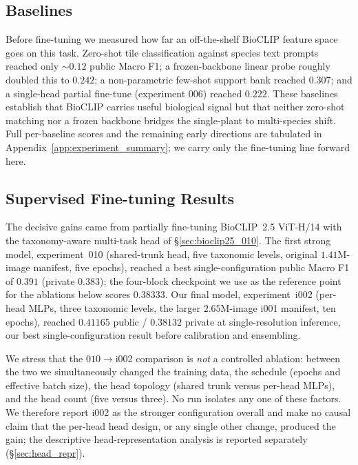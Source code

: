 \subsection{Baselines}
\label{sec:baselines}

Before fine-tuning we measured how far an off-the-shelf BioCLIP feature space goes on this
task. Zero-shot tile classification against species text prompts reached only ${\sim}0.12$
public Macro F1; a frozen-backbone linear probe roughly doubled this to $0.242$; a
non-parametric few-shot support bank reached $0.307$; and a single-head partial fine-tune
(experiment 006) reached $0.222$. These baselines establish that BioCLIP carries useful
biological signal but that neither zero-shot matching nor a frozen backbone bridges the
single-plant to multi-species shift. Full per-baseline scores and the remaining early
directions are tabulated in Appendix~\ref{app:experiment_summary}; we carry only the
fine-tuning line forward here.

\subsection{Supervised Fine-tuning Results}
\label{sec:supervised_ft}

The decisive gains came from partially fine-tuning BioCLIP~2.5 ViT-H/14 with the
taxonomy-aware multi-task head of \S\ref{sec:bioclip25_010}. The first strong model,
experiment~010 (shared-trunk head, five taxonomic levels, original $1.41$M-image manifest,
five epochs), reached a best single-configuration public Macro F1 of $0.391$ (private
$0.383$); the four-block checkpoint we use as the reference point for the ablations below
scores $0.38333$. Our final model, experiment~i002 (per-head MLPs, three taxonomic levels,
the larger $2.65$M-image i001 manifest, ten epochs), reached $0.41165$ public / $0.38132$
private at single-resolution inference, our best single-configuration result before
calibration and ensembling.

We stress that the $010\rightarrow$i002 comparison is \emph{not} a controlled ablation: between
the two we simultaneously changed the training data, the schedule (epochs and effective batch
size), the head topology (shared trunk versus per-head MLPs), and the head count (five versus
three). No run isolates any one of these factors. We therefore report i002 as the stronger
configuration overall and make no causal claim that the per-head head design, or any single
other change, produced the gain; the descriptive head-representation analysis is reported
separately (\S\ref{sec:head_repr}).

